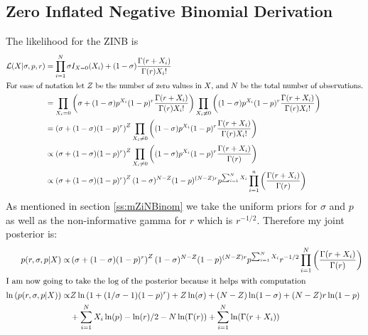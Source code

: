 \documentclass{article}\usepackage[]{graphicx}\usepackage[]{color}
\begin{document}
\subsection{Zero Inflated Negative Binomial Derivation}
\label{a:dZINB}
The likelihood for the ZINB is 
\begin{align*}
\mathcal{L}(X|\sigma, p, r) &= \prod_{i=1}^N \sigma I_{X=0}(X_i) + (1-\sigma)\frac{\Gamma(r+X_i)}{\Gamma(r)X_i!}\\
\intertext{For ease of notation let $Z$ be the number of zero values in $X$, and $N$ be the total number of observations.}
&=\prod_{X_i=0}\left(\sigma + (1-\sigma)p^{X_i}(1-p)^r\frac{\Gamma(r+X_i)}{\Gamma(r)X_i!}\right)\prod_{X_i\ne 0}\left((1-\sigma)p^{X_i}(1-p)^r\frac{\Gamma(r+X_i)}{\Gamma(r)X_i!}\right)\\
&=\left(\sigma + (1-\sigma)(1-p)^r\right)^Z\prod_{X_i\ne 0}\left((1-\sigma)p^{X_i}(1-p)^r\frac{\Gamma(r+X_i)}{\Gamma(r)X_i!}\right)\\
&\propto\left(\sigma + (1-\sigma)(1-p)^r\right)^Z\prod_{X_i\ne 0}\left((1-\sigma)p^{X_i}(1-p)^r\frac{\Gamma(r+X_i)}{\Gamma(r)}\right)\\
&\propto\left(\sigma + (1-\sigma)(1-p)^r\right)^Z(1-\sigma)^{N-Z}(1-p)^{(N-Z)r}p^{\sum_{i=1}^NX_i}\prod_{i=1}^n\left(\frac{\Gamma(r+X_i)}{\Gamma(r)}\right)
\end{align*}
As mentioned in section \ref{ss:mZiNBinom} we take the uniform priors for $\sigma$ and $p$ as well as the non-informative gamma for $r$ which is $r^{-1/2}$. Therefore my joint posterior is:
\begin{align*}
p(r,\sigma, p|X)\propto&\left(\sigma + (1-\sigma)(1-p)^r\right)^Z(1-\sigma)^{N-Z}(1-p)^{(N-Z)r}p^{\sum_{i=1}^NX_i}r^{-1/2}\prod_{i=1}^N\left(\frac{\Gamma(r+X_i)}{\Gamma(r)}\right)\\
\intertext{I am now going to take the log of the posterior because it helps with computation}
\ln\left(p(r,\sigma, p|X)\right)\propto&Z\ln\left(1 + (1/\sigma-1)(1-p)^r\right) + Z\ln(\sigma) + (N-Z)\ln(1-\sigma)+(N-Z)r\ln(1-p)\\
&+\sum_{i=1}^NX_i\ln(p)-\ln(r)/2-N\ln(\Gamma(r))+\sum_{i=1}^N\ln(\Gamma(r+X_i))
\end{align*}
\end{document}
